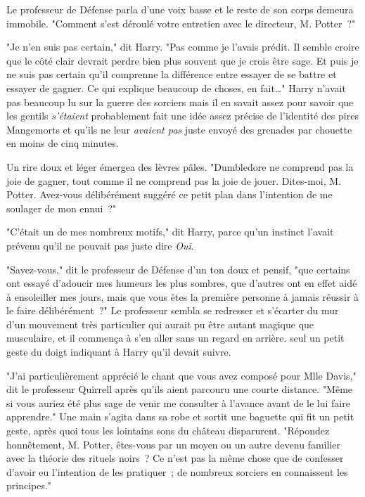 Le professeur de Défense parla d'une voix basse et le reste de son corps demeura immobile. "Comment s'est déroulé votre entretien avec le directeur, M. Potter~?"

"Je n'en suis pas certain," dit Harry. "Pas comme je l'avais prédit. Il semble croire que le côté clair devrait perdre bien plus souvent que je crois être sage. Et puis je ne suis pas certain qu'il comprenne la différence entre essayer de se battre et essayer de gagner. Ce qui explique beaucoup de choses, en fait…" Harry n'avait pas beaucoup lu sur la guerre des sorciers mais il en savait assez pour savoir que les gentils \emph{s'étaient} probablement fait une idée assez précise de l'identité des pires Mangemorts et qu'ils ne leur \emph{avaient pas} juste envoyé des grenades par chouette en moins de cinq minutes.

Un rire doux et léger émergea des lèvres pâles. "Dumbledore ne comprend pas la joie de gagner, tout comme il ne comprend pas la joie de jouer. Dites-moi, M. Potter. Avez-vous délibérément suggéré ce petit plan dans l'intention de me soulager de mon ennui~?"

"C'était un de mes nombreux motifs," dit Harry, parce qu'un instinct l'avait prévenu qu'il ne pouvait pas juste dire \emph{Oui}.

"Savez-vous," dit le professeur de Défense d'un ton doux et pensif, "que certains ont essayé d'adoucir mes humeurs les plus sombres, que d'autres ont en effet aidé à ensoleiller mes jours, mais que vous êtes la première personne à jamais réussir à le faire délibérément~?" Le professeur sembla se redresser et s'écarter du mur d'un mouvement très particulier qui aurait pu être autant magique que musculaire, et il commença à s'en aller sans un regard en arrière. seul un petit geste du doigt indiquant à Harry qu'il devait suivre.

"J'ai particulièrement apprécié le chant que vous avez composé pour Mlle Davis," dit le professeur Quirrell après qu'ils aient parcouru une courte distance. "Même si vous auriez été plus sage de venir me consulter à l'avance avant de le lui faire apprendre." Une main s'agita dans sa robe et sortit une baguette qui fit un petit geste, après quoi tous les lointains sons du château disparurent. "Répondez honnêtement, M. Potter, êtes-vous par un moyen ou un autre devenu familier avec la théorie des rituels noirs~? Ce n'est pas la même chose que de confesser d'avoir eu l'intention de les pratiquer~; de nombreux sorciers en connaissent les principes."

